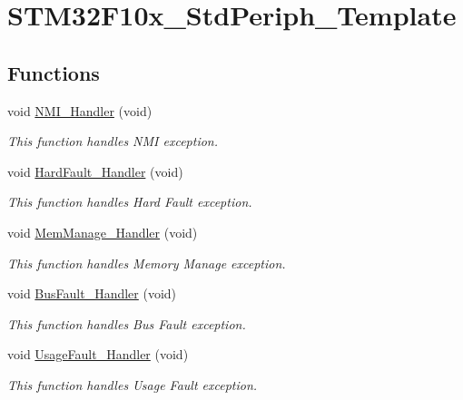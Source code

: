 \hypertarget{group___s_t_m32_f10x___std_periph___template}{
\section{STM32F10x\_\-StdPeriph\_\-Template}
\label{group___s_t_m32_f10x___std_periph___template}
}
\subsection*{Functions}
\begin{DoxyCompactItemize}
\item 
void \hyperlink{group___s_t_m32_f10x___std_periph___template_ga6ad7a5e3ee69cb6db6a6b9111ba898bc}{NMI\_\-Handler} (void)
\begin{DoxyCompactList}\small\item\em This function handles NMI exception. \item\end{DoxyCompactList}\item 
void \hyperlink{group___s_t_m32_f10x___std_periph___template_ga2bffc10d5bd4106753b7c30e86903bea}{HardFault\_\-Handler} (void)
\begin{DoxyCompactList}\small\item\em This function handles Hard Fault exception. \item\end{DoxyCompactList}\item 
void \hyperlink{group___s_t_m32_f10x___std_periph___template_ga3150f74512510287a942624aa9b44cc5}{MemManage\_\-Handler} (void)
\begin{DoxyCompactList}\small\item\em This function handles Memory Manage exception. \item\end{DoxyCompactList}\item 
void \hyperlink{group___s_t_m32_f10x___std_periph___template_ga850cefb17a977292ae5eb4cafa9976c3}{BusFault\_\-Handler} (void)
\begin{DoxyCompactList}\small\item\em This function handles Bus Fault exception. \item\end{DoxyCompactList}\item 
void \hyperlink{group___s_t_m32_f10x___std_periph___template_ga1d98923de2ed6b7309b66f9ba2971647}{UsageFault\_\-Handler} (void)
\begin{DoxyCompactList}\small\item\em This function handles Usage Fault exception. \item\end{DoxyCompactList}\item 

\end{DoxyCompactItemize}
